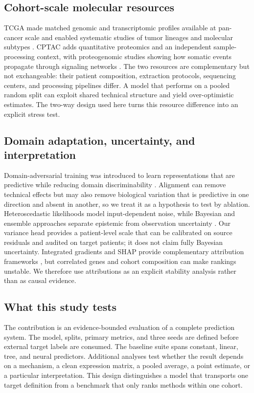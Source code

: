 \documentclass[11pt]{article}
\begin{document}
\subsection{Cohort-scale molecular resources}
TCGA made matched genomic and transcriptomic profiles available at pan-cancer scale and enabled systematic studies of tumor lineages and molecular subtypes \citep{CancerGenomeAtlas2013}. CPTAC adds quantitative proteomics and an independent sample-processing context, with proteogenomic studies showing how somatic events propagate through signaling networks \citep{Mertins2016CPTAC,DJ201966234}. The two resources are complementary but not exchangeable: their patient composition, extraction protocols, sequencing centers, and processing pipelines differ. A model that performs on a pooled random split can exploit shared technical structure and yield over-optimistic estimates. The two-way design used here turns this resource difference into an explicit stress test.

\subsection{Domain adaptation, uncertainty, and interpretation}
Domain-adversarial training was introduced to learn representations that are predictive while reducing domain discriminability \citep{Ganin2016DANN}. Alignment can remove technical effects but may also remove biological variation that is predictive in one direction and absent in another, so we treat it as a hypothesis to test by ablation. Heteroscedastic likelihoods model input-dependent noise, while Bayesian and ensemble approaches separate epistemic from observation uncertainty \citep{Kendall2018Uncertainty}. Our variance head provides a patient-level scale that can be calibrated on source residuals and audited on target patients; it does not claim fully Bayesian uncertainty. Integrated gradients and SHAP provide complementary attribution frameworks \citep{Sundararajan2017IG,Lundberg2017SHAP}, but correlated genes and cohort composition can make rankings unstable. We therefore use attributions as an explicit stability analysis rather than as causal evidence.

\subsection{What this study tests}
The contribution is an evidence-bounded evaluation of a complete prediction system. The model, splits, primary metrics, and three seeds are defined before external target labels are consumed. The baseline suite spans constant, linear, tree, and neural predictors. Additional analyses test whether the result depends on a mechanism, a clean expression matrix, a pooled average, a point estimate, or a particular interpretation. This design distinguishes a model that transports one target definition from a benchmark that only ranks methods within one cohort.
\end{document}
